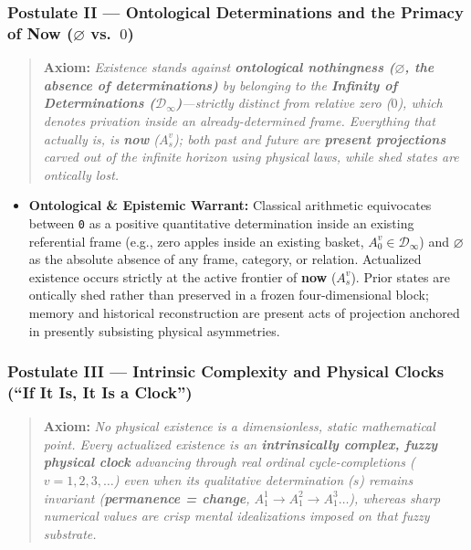 \documentclass[
]{article}
\providecommand{\tightlist}{%
  \setlength{\itemsep}{0pt}\setlength{\parskip}{0pt}}
\begin{document}
\subsubsection{\texorpdfstring{Postulate II --- Ontological
Determinations and the Primacy of Now (\(\varnothing\)
vs.~\(0\))}{Postulate II --- Ontological Determinations and the Primacy of Now (\textbackslash varnothing vs.~0)}}\label{postulate-ii-ontological-determinations-and-the-primacy-of-now-varnothing-vs.-0}

\begin{quote}
\textbf{Axiom:} \emph{Existence stands against \textbf{ontological
nothingness (\(\varnothing\), the absence of determinations)} by
belonging to the \textbf{Infinity of Determinations
(\(\mathcal{D}_\infty\))}---strictly distinct from relative zero
(\(0\)), which denotes privation inside an already-determined frame.
Everything that actually is, is \textbf{now} (\(A_s^v\)); both past and
future are \textbf{present projections} carved out of the infinite
horizon using physical laws, while shed states are ontically lost.}
\end{quote}

\begin{itemize}
\tightlist
\item
  \textbf{Ontological \& Epistemic Warrant:} Classical arithmetic
  equivocates between \texttt{0} as a positive quantitative
  determination inside an existing referential frame (e.g., zero apples
  inside an existing basket, \(A_0^v \in \mathcal{D}_\infty\)) and
  \(\varnothing\) as the absolute absence of any frame, category, or
  relation. Actualized existence occurs strictly at the active frontier
  of \textbf{now} (\(A_s^v\)). Prior states are ontically shed rather
  than preserved in a frozen four-dimensional block; memory and
  historical reconstruction are present acts of projection anchored in
  presently subsisting physical asymmetries.
\end{itemize}

\subsubsection{Postulate III --- Intrinsic Complexity and Physical
Clocks (``If It Is, It Is a
Clock'')}\label{postulate-iii-intrinsic-complexity-and-physical-clocks-if-it-is-it-is-a-clock}

\begin{quote}
\textbf{Axiom:} \emph{No physical existence is a dimensionless, static
mathematical point. Every actualized existence is an
\textbf{intrinsically complex, fuzzy physical clock} advancing through
real ordinal cycle-completions (\(v = 1, 2, 3, \dots\)) even when its
qualitative determination (\(s\)) remains invariant (\textbf{permanence
= change}, \(A_1^1 \to A_1^2 \to A_1^3 \dots\)), whereas sharp numerical
values are crisp mental idealizations imposed on that fuzzy substrate.}
\end{quote}
\end{document}
